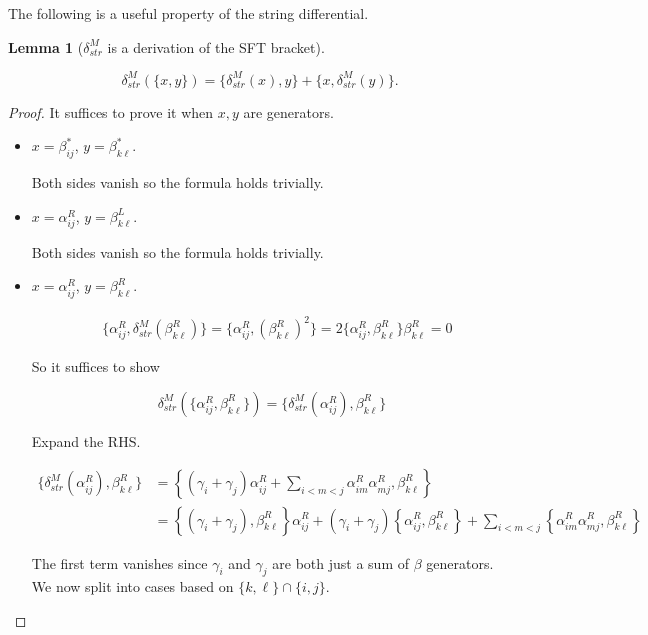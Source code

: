 \documentclass[a4paper,final, reqno]{amsart}
\theoremstyle{plain}
\newtheorem{Lemma}[Th]{Lemma}
\theoremstyle{definition}
\begin{document}
	The following is a useful property of the string differential.
	
	\begin{Lemma}[$\delta_{str}^M$ is a derivation of the SFT bracket] \label{lem:deltaMderivation}
		
		\[ \delta_{str}^M\left(\{x,y\}\right) = \{\delta_{str}^M( x), y\} + \{x, \delta_{str}^M(y)\}.\]
		
	\end{Lemma}
	
	\begin{proof}
		It suffices to prove it when $x,y$ are generators.
		\begin{itemize}
			\item $x=\beta_{ij}^*$, $y=\beta_{k\ell}^*$.
			
			Both sides vanish so the formula holds trivially.
			
			\item $x=\alpha_{ij}^R$, $y=\beta_{k\ell}^L$. 
			
			Both sides vanish so the formula holds trivially. 
			
						
			\item $x=\alpha_{ij}^R$, $y=\beta_{k\ell}^R$. 
			
			\begin{align*}
				&\{\alpha_{ij}^R, \delta_{str}^M(\beta_{k\ell}^R)\} = \{\alpha_{ij}^R, (\beta_{k\ell}^R)^2\} = 2\{\alpha_{ij}^R, \beta_{k\ell}^R\}\beta_{k\ell}^R = 0
			\end{align*}
			
			So it suffices to show
			
			\[ \delta_{str}^M\left(\{\alpha_{ij}^R,\beta_{k\ell}^R\}\right) = \{\delta_{str}^M(\alpha_{ij}^R), \beta_{k\ell}^R\}\]
			
			Expand the RHS.
			
			\begin{align*}
				\{\delta_{str}^M(\alpha_{ij}^R), \beta_{k\ell}^R\} &= \left\{ (\gamma_i+\gamma_j) \alpha_{ij}^R + \sum_{i<m<j} \alpha_{im}^R\alpha_{mj}^R , \beta_{k\ell}^R \right\} \\
				&= \left\{(\gamma_i+\gamma_j), \beta_{k\ell}^R \right\} \alpha_{ij}^R + (\gamma_i+\gamma_j)\left\{ \alpha_{ij}^R, \beta_{k\ell}^R \right\} + \sum_{i<m<j} \left\{\alpha_{im}^R\alpha_{mj}^R, \beta_{k\ell}^R \right\}
			\end{align*}
			
			The first term vanishes since $\gamma_i$ and $\gamma_j$ are both just a sum of $\beta$ generators. We now split into cases based on $\{k,\ell\} \cap \{i,j\}$.
			

\end{itemize}
\end{proof}
\end{document}
